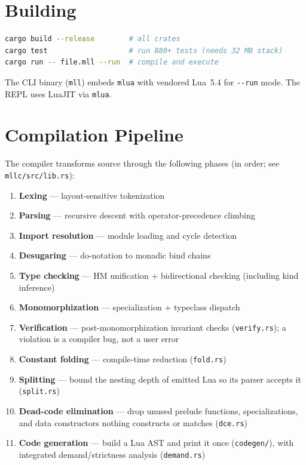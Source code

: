 \documentclass[11pt,a4paper]{article}
\begin{document}
\section{Building}

\begin{lstlisting}[language=bash]
cargo build --release        # all crates
cargo test                   # run 880+ tests (needs 32 MB stack)
cargo run -- file.mll --run  # compile and execute
\end{lstlisting}

The CLI binary (\texttt{mll}) embeds \texttt{mlua} with vendored Lua~5.4 for
\texttt{-{}-run} mode.  The REPL uses LuaJIT via \texttt{mlua}.

\section{Compilation Pipeline}

The compiler transforms source through the following phases (in order; see
\texttt{mllc/src/lib.rs}):

\begin{enumerate}[nosep]
  \item \textbf{Lexing} --- layout-sensitive tokenization
  \item \textbf{Parsing} --- recursive descent with operator-precedence climbing
  \item \textbf{Import resolution} --- module loading and cycle detection
  \item \textbf{Desugaring} --- do-notation to monadic bind chains
  \item \textbf{Type checking} --- HM unification + bidirectional checking
        (including kind inference)
  \item \textbf{Monomorphization} --- specialization + typeclass dispatch
  \item \textbf{Verification} --- post-monomorphization invariant checks
        (\texttt{verify.rs}); a violation is a compiler bug, not a user error
  \item \textbf{Constant folding} --- compile-time reduction (\texttt{fold.rs})
  \item \textbf{Splitting} --- bound the nesting depth of emitted Lua so its
        parser accepts it (\texttt{split.rs})
  \item \textbf{Dead-code elimination} --- drop unused prelude functions,
        specializations, and data constructors nothing constructs or
        matches (\texttt{dce.rs})
  \item \textbf{Code generation} --- build a Lua AST and print it once
        (\texttt{codegen/}), with integrated demand/strictness analysis
        (\texttt{demand.rs})
\end{enumerate}
\end{document}
